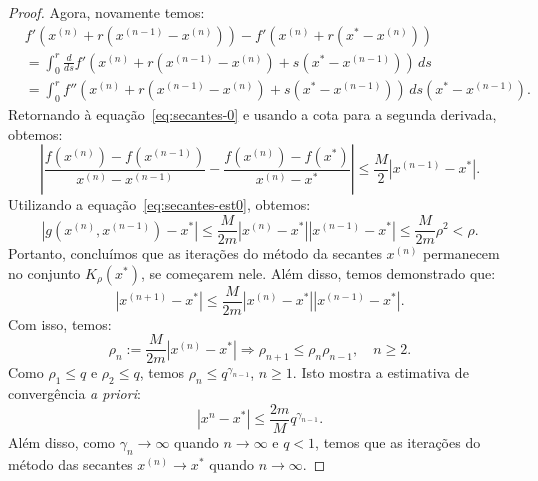 \begin{proof}
Agora, novamente temos:
\begin{equation*}
  \begin{split}
  &f'(x^{(n)} + r(x^{(n-1)} - x^{(n)})) - f'(x^{(n)} + r(x^* - x^{(n)}))\\
  &= \int_0^r \frac{d}{ds}f'(x^{(n)} + r(x^{(n-1)} - x^{(n)}) + s(x^* - x^{(n-1)}))\,ds\\
  &= \int_0^r f''(x^{(n)} + r(x^{(n-1)} - x^{(n)}) + s(x^* - x^{(n-1)}))\,ds(x^* - x^{(n-1)}).
  \end{split}
\end{equation*}
Retornando à equação~\eqref{eq:secantes-0} e usando a cota para a segunda derivada, obtemos:
\begin{equation*}
  \left|\frac{f(x^{(n)}) - f(x^{(n-1)})}{x^{(n)} - x^{(n-1)}} - \frac{f(x^{(n)}) - f(x^*)}{x^{(n)} - x^*} \right| \leq \frac{M}{2}|x^{(n-1)} - x^*|.
\end{equation*}
Utilizando a equação~\eqref{eq:secantes-est0}, obtemos:
\begin{equation*}
  |g(x^{(n)},x^{(n-1)})-x^*| \leq \frac{M}{2m}|x^{(n)}-x^*||x^{(n-1)}-x^*| \leq \frac{M}{2m}\rho^2 < \rho.
\end{equation*}
Portanto, concluímos que as iterações do método da secantes $x^{(n)}$ permanecem no conjunto $K_\rho(x^*)$, se começarem nele. Além disso, temos demonstrado que:
\begin{equation*}
  |x^{(n+1)} - x^*| \leq \frac{M}{2m}|x^{(n)} - x^*||x^{(n-1)} - x^*|.
\end{equation*}
Com isso, temos:
\begin{equation*}
  \rho_n := \frac{M}{2m}|x^{(n)} - x^*| \Rightarrow \rho_{n+1} \leq \rho_{n}\rho_{n-1},\quad n\geq 2.
\end{equation*}
Como $\rho_1 \leq q$ e $\rho_2 \leq q$, temos $\rho_n \leq q^{\gamma_{n-1}}$, $n\geq 1$. Isto mostra a estimativa de convergência \emph{a priori}:
\begin{equation*}
  |x^{n} - x^*| \leq \frac{2m}{M}q^{\gamma_{n-1}}.
\end{equation*}
Além disso, como $\gamma_{n}\to \infty$ quando $n\to\infty$ e $q < 1$, temos que as iterações do método das secantes $x^{(n)}\to x^*$ quando $n\to \infty$.


\end{proof}
